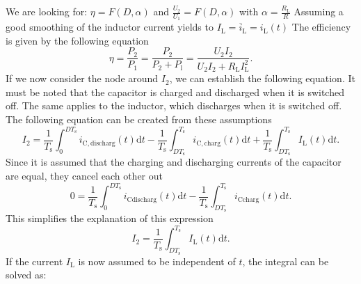 \begin{solutionblock}
We are looking for: $\eta= F(D,\alpha)$ and $\frac{U_\mathrm{2}}{U_\mathrm{1}}=F(D,\alpha)$ with $\alpha=\frac{R_\mathrm{L}}{R}$
Assuming a good smoothing of the inductor current yields to $I_\mathrm{L}=\overline i_\mathrm{L}=i_\mathrm{L}(t)$
The efficiency is given by the following equation
\begin{equation}
    \eta = \frac{P_\mathrm{2}}{P_\mathrm{1}} = \frac{P_\mathrm{2}}{P_\mathrm{2}+P_\mathrm{l}} = \frac{U_\mathrm{2} I_\mathrm{2}}{U_\mathrm{2} I_\mathrm{2} +R_\mathrm{L} I_\mathrm{L}^2} \label{eq:efficiency}.
\end{equation}
If we now consider the node around $I_\mathrm{2}$, we can establish the following equation. It must be noted that the capacitor is charged and discharged when it is switched off. The same applies to the inductor, which discharges when it is switched off. The following equation can be created from these assumptions
\begin{equation}
    I_\mathrm{2}=\frac{1}{T_\mathrm{s}} \int_{0}^{DT_\mathrm{s}} i_\mathrm{C, discharg}(t)\mathrm{d}t-\frac{1}{T_\mathrm{s}} \int_{DT_\mathrm{s}}^{T_\mathrm{s}} i_\mathrm{C,charg}(t)\mathrm{d}t+\frac{1}{T_\mathrm{s}} \int_{DT_\mathrm{s}}^{T_\mathrm{s}} I_\mathrm{L}(t)\mathrm{d}t.
\end{equation}
Since it is assumed that the charging and discharging currents of the capacitor are equal, they cancel each other out
\begin{equation}
    0 = \frac{1}{T_\mathrm{s}} \int_{0}^{DT_\mathrm{s}} i_\mathrm{C discharg}(t)\mathrm{d}t-\frac{1}{T_\mathrm{s}} \int_{DT_\mathrm{s}}^{T_\mathrm{s}} i_\mathrm{C charg}(t)\mathrm{d}t.
\end{equation}
This simplifies the explanation of this expression
\begin{equation}
    I_\mathrm{2}= \frac{1}{T_\mathrm{s}} \int_{DT_\mathrm{s}}^{T_\mathrm{s}} I_\mathrm{L}(t)\mathrm{d}t.
\end{equation}
If the current $I_\mathrm{L}$ is now assumed to be independent of $t$, the integral can be solved as:
\begin{equation}

\end{equation}
\end{solutionblock}
